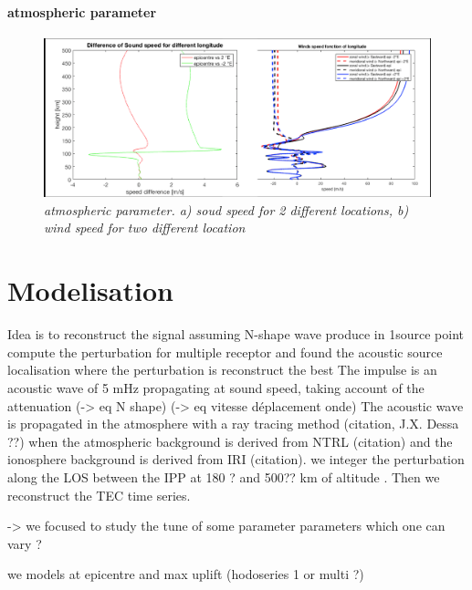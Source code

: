 \documentclass{gji}
\begin{document}
\paragraph{atmospheric parameter}
\begin{figure}
\begin{center}
\includegraphics[width=1\linewidth]{images/sound_wind_epiVS2deg.png}
\end{center}
\caption{ \textit{\emph{atmospheric parameter}. a) soud speed for 2 different locations, b) wind speed for two different location }} 

\label{atmos_param}
\end{figure}


\section{Modelisation} 
        Idea is to reconstruct the signal assuming N-shape wave produce in 1source point compute the perturbation for multiple receptor and found the acoustic source localisation where the perturbation is  reconstruct the best
      The impulse is an acoustic wave of 5 mHz propagating at sound speed, taking account of the attenuation 
        (-> eq N shape)
        (-> eq vitesse déplacement onde)
         The acoustic wave is propagated in the atmosphere with a ray tracing method (citation, J.X. Dessa ??) when the atmospheric background is derived from NTRL (citation) and the ionosphere background is derived from IRI (citation). 
        we integer the perturbation along the LOS between the IPP at 180 ? and 500?? km of altitude . 
        Then we reconstruct the TEC time series.

             -> we focused to study the tune of some parameter parameters which one can vary ?

    we models at epicentre and max uplift (hodoseries 1 or multi ?)
    
\end{document}
